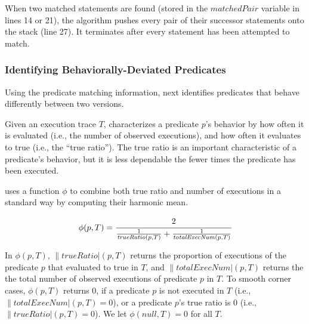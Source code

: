 When two matched statements are found  (stored in
the $\mathit{matchedPair}$ variable in lines 14 or 21),
the algorithm pushes every pair of
their successor statements onto the stack (line 27).
It terminates after every statement has been attempted to match.


%

\subsubsection{Identifying Behaviorally-Deviated Predicates}
\label{sec:identify_diff}

Using the predicate matching information, \ourtool next
identifies predicates that behave differently
between two versions. 

Given an execution trace $\mathit{T}$,
\ourtool characterizes a predicate $\mathit{p}$'s behavior by how often
it is evaluated (i.e., the number of observed executions),
and how often it evaluates to true (i.e., the ``true ratio'').
The true ratio is an important characteristic of a predicate's behavior,
but it is less dependable
the fewer times the predicate has been executed.

\ourtool uses a function $\phi$ to combine both true ratio
and number of executions in a standard way by computing their harmonic mean.


\vspace{-2mm}

\begin{equation*}
 \|\phi|(p, T)= \cfrac{2}{\frac{1}{\|trueRatio|(p, T)} + \frac{1}{\|totalExecNum|(p, T)}}
\end{equation*}

\vspace{-1mm}

In $\phi(p, T)$, $\|trueRatio|(p, T)$ returns the proportion of executions of the
predicate $p$ that evaluated to true in $T$,
and $\|totalExecNum|(p, T)$ returns the the total
number of observed executions of predicate $p$ in $T$.
To smooth corner cases, $\phi(p, T)$ returns 0, if a predicate $p$ is not executed in $T$ 
(i.e., $\|totalExecNum|(p, T) = 0$), or
a predicate $p$'s true ratio is 0 (i.e., $\|trueRatio|(p, T) = 0$).
We let $\phi(null, T) = 0$ for all $T$.


